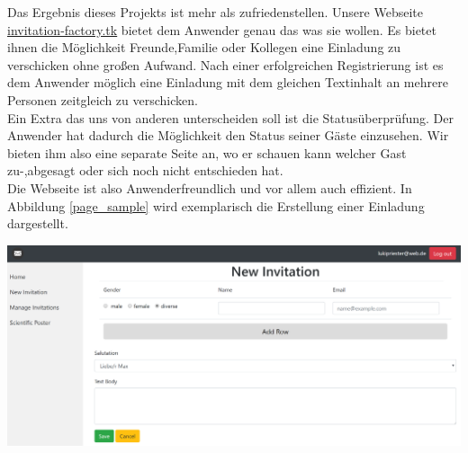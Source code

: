 \documentclass[landscape,a0paper,fontscale=0.35]{baposter} %
\begin{document}
\begin{poster}
{
	\begin{multicols}{3}
		Das Ergebnis dieses Projekts ist mehr als zufriedenstellen. Unsere Webseite \url{invitation-factory.tk} bietet dem Anwender genau das was sie wollen. Es bietet ihnen die Möglichkeit Freunde,Familie oder Kollegen eine Einladung zu verschicken ohne großen Aufwand. Nach einer erfolgreichen Registrierung ist es dem Anwender möglich eine Einladung mit dem gleichen Textinhalt an mehrere Personen zeitgleich zu verschicken.\\
		Ein Extra das uns von anderen unterscheiden soll ist die Statusüberprüfung. Der Anwender hat dadurch die Möglichkeit den Status seiner Gäste einzusehen. Wir bieten ihm also eine separate Seite an, wo er schauen kann welcher Gast zu-,abgesagt oder sich noch nicht entschieden hat.\\
		Die Webseite ist also Anwenderfreundlich und vor allem auch effizient. In Abbildung \ref{page_sample} wird exemplarisch die Erstellung einer Einladung dargestellt.
		\begin{center}
					\includegraphics[width=0.6\linewidth]{New_Invitation_Seite.PNG}
			\label{page_sample}
		\end{center}

	\end{multicols}
	
	
	
}
\end{poster}
\end{document}
